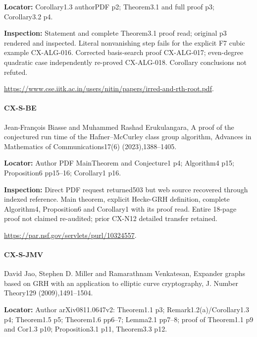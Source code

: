 \documentclass[11pt,a4paper]{article}
\begin{document}
\textbf{Locator:} Corollary1.\allowbreak{}3 authorPDF p2; Theorem3.\allowbreak{}1 and full proof p3; Corollary3.\allowbreak{}2 p4.

\textbf{Inspection:} Statement and complete Theorem3.\allowbreak{}1 proof read; original p3 rendered and inspected.\allowbreak{} Literal nonvanishing step fails for the explicit F7 cubic example CX-ALG-016.\allowbreak{} Corrected basis-search proof CX-ALG-017; even-degree quadratic case independently re-proved CX-ALG-018.\allowbreak{} Corollary conclusions not refuted.\allowbreak{}

\url{https://www.cse.iitk.ac.in/users/nitin/papers/irred-and-rth-root.pdf}.

\paragraph{CX-S-BE} Jean-François Biasse and Muhammed Rashad Erukulangara, A proof of the conjectured run time of the Hafner–\allowbreak{}McCurley class group algorithm, Advances in Mathematics of Communications17(6) (2023),1388–\allowbreak{}1405.

\textbf{Locator:} Author PDF MainTheorem and Conjecture1 p4; Algorithm4 p15; Proposition6 pp15–\allowbreak{}16; Corollary1 p16.

\textbf{Inspection:} Direct PDF request returned503 but web source recovered through indexed reference.\allowbreak{} Main theorem, explicit Hecke-GRH definition, complete Algorithm4, Proposition6 and Corollary1 with its proof read.\allowbreak{} Entire 18-page proof not claimed re-audited; prior CX-N12 detailed transfer retained.\allowbreak{}

\url{https://par.nsf.gov/servlets/purl/10324557}.

\paragraph{CX-S-JMV} David Jao, Stephen D.\allowbreak{} Miller and Ramarathnam Venkatesan, Expander graphs based on GRH with an application to elliptic curve cryptography, J.\allowbreak{} Number Theory129 (2009),1491–\allowbreak{}1504.

\textbf{Locator:} Author arXiv0811.\allowbreak{}0647v2:\allowbreak{} Theorem1.\allowbreak{}1 p3; Remark1.\allowbreak{}2(a)/\allowbreak{}Corollary1.\allowbreak{}3 p4; Theorem1.\allowbreak{}5 p5; Theorem1.\allowbreak{}6 pp6–\allowbreak{}7; Lemma2.\allowbreak{}1 pp7–\allowbreak{}8; proof of Theorem1.\allowbreak{}1 p9 and Cor1.\allowbreak{}3 p10; Proposition3.\allowbreak{}1 p11, Theorem3.\allowbreak{}3 p12.
\end{document}
